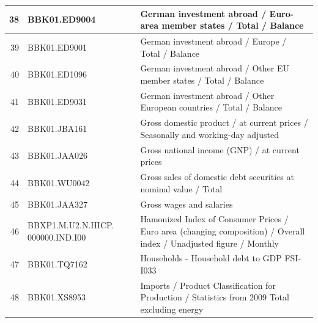 \documentclass[11pt]{article}
\begin{document}
\begin{table}
\begin{tabular}{rp{5cm}p{11cm}}
  \hline
  38 & BBK01.ED9004 & German investment abroad / Euro-area member states / Total / Balance \\ 
  \hline
  39 & BBK01.ED9001 & German investment abroad / Europe / Total / Balance \\ 
  \hline
  40 & BBK01.ED1096 & German investment abroad / Other EU member states / Total / Balance \\   
  \hline
  41 & BBK01.ED9031 & German investment abroad / Other European countries / Total / Balance \\ 
  \hline
  42 & BBK01.JBA161 & Gross domestic product / at current prices / Seasonally and working-day adjusted \\ 
  \hline
  43 & BBK01.JAA026 & Gross national income (GNP) / at current prices \\ 
  \hline
  44 & BBK01.WU0042 & Gross sales of domestic debt securities at nominal value / Total \\ 
  \hline
  45 & BBK01.JAA327 & Gross wages and salaries \\ 
  \hline
  46 & BBXP1.M.U2.N.HICP. 000000.IND.I00 & Hamonized Index of Consumer Prices / Euro area (changing composition) / Overall index / Unadjusted figure / Monthly \\ 
  \hline
  47 & BBK01.TQ7162 & Households - Household debt to GDP FSI-I033 \\ 
  \hline
  48 & BBK01.XS8953 & Imports / Product Classification for Production / Statistics from 2009 Total excluding energy \\ 
\end{tabular}
\end{table}
\end{document}

